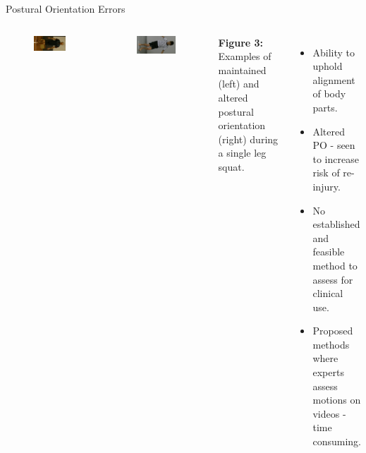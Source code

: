 \begin{frame}[fragile]{Postural Orientation Errors}
  \begin{columns}[T,onlytextwidth]
    \centering
  \begin{columns}[T,onlytextwidth]

      \begin{figure}
        \raggedleft
        \includegraphics[angle=90,height=0.7\textheight]{files/figs/presentation/good-poe.png}
      \end{figure}

      \begin{figure}
        \raggedright
        \includegraphics[angle=90,height=0.7\textheight]{files/figs/presentation/poor-poe.png}
      \end{figure}
  \end{columns}
  \vspace{0.1cm}
  {\scriptsize\textbf{Figure 3:} Examples of maintained (left) and altered postural orientation (right) during a single leg squat. \newline}
  \begin{itemize}
    \item Ability to uphold alignment of body parts.
    \item Altered PO - seen to increase risk of re-injury.
    \item No established and feasible method to assess for clinical use.
    \item Proposed methods where experts assess motions on videos - time consuming\footnotemark.
  \end{itemize}
  \end{columns}


\end{frame}
